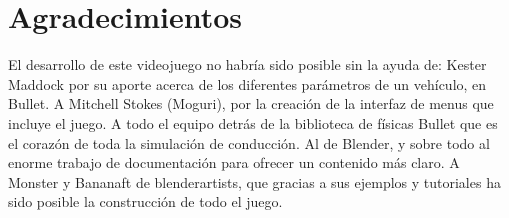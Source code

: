 \documentclass[11pt,a4paper,hidelinks]{article}
\begin{document}
\section{Agradecimientos}
El desarrollo de este videojuego no habría sido posible sin la ayuda de:
Kester Maddock por su aporte acerca de los diferentes parámetros de un vehículo, 
en Bullet. A Mitchell Stokes (Moguri), por la creación de la interfaz de menus 
que incluye el juego. A todo el equipo detrás de la biblioteca de físicas Bullet 
que es el corazón de toda la simulación de conducción. Al de Blender, y sobre 
todo al enorme trabajo de documentación para ofrecer un contenido más claro. A 
Monster y Bananaft de blenderartists, que gracias a sus ejemplos y tutoriales ha 
sido posible la construcción de todo el juego.
\end{document}
